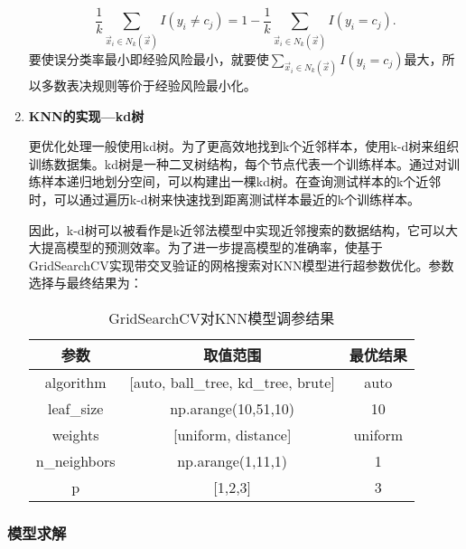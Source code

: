 \begin{enumerate}
    \begin{equation}
        \frac{1}{k}\sum\limits_{{{\overrightarrow{x}}_{i}}\in {{N}_{k}}\left( \overrightarrow{x} \right)}{I\left( {{y}_{i}}\ne {{c}_{j}} \right)}=1-\frac{1}{k}\sum\limits_{{{\overrightarrow{x}}_{i}}\in {{N}_{k}}\left( \overrightarrow{x} \right)}{I\left( {{y}_{i}}={{c}_{j}} \right)}.
    \end{equation}
    要使误分类率最小即经验风险最小，就要使$\sum\limits_{{{\overrightarrow{x}}_{i}}\in {{N}_{k}}\left( \overrightarrow{x} \right)}{I\left( {{y}_{i}}={{c}_{j}} \right)}$最大，所以多数表决规则等价于经验风险最小化。 
    
    \item \textbf{KNN的实现—kd树}
    
    更优化处理一般使用kd树。为了更高效地找到k个近邻样本，使用k-d树来组织训练数据集。kd树是一种二叉树结构，每个节点代表一个训练样本。通过对训练样本递归地划分空间，可以构建出一棵kd树。在查询测试样本的k个近邻时，可以通过遍历k-d树来快速找到距离测试样本最近的k个训练样本。
    
    因此，k-d树可以被看作是k近邻法模型中实现近邻搜索的数据结构，它可以大大提高模型的预测效率。为了进一步提高模型的准确率，使基于GridSearchCV实现带交叉验证的网格搜索对KNN模型进行超参数优化。参数选择与最终结果为：
    
    \begin{table}[H]
        \centering  
        \caption{GridSearchCV对KNN模型调参结果}
        \begin{tabular}{c c c}  
        	\toprule[1.5pt]  
        	参数 & 取值范围 & 最优结果 \\  
        	\midrule[1pt]    
        	algorithm & [auto, ball\_tree, kd\_tree, brute] & auto\\ 
        	leaf\_size & np.arange(10,51,10) & 10 \\
        	weights & [uniform, distance] & uniform \\
        	n\_neighbors & np.arange(1,11,1) & 1 \\
        	p & [1,2,3] & 3 \\ 
        	\toprule[1.5pt]  
        \end{tabular}  
    \end{table} 
\end{enumerate}

\subsubsection{模型求解}


